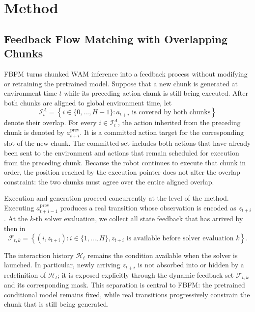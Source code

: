 
\section{Method}
\label{sec:method}


\subsection{Feedback Flow Matching with Overlapping Chunks}
\label{sec:method:overlap}

FBFM turns chunked WAM inference into a feedback process without modifying or
retraining the pretrained model. Suppose that a new chunk is generated at
environment time $t$ while its preceding action chunk is still being executed.
After both chunks are aligned to global environment time, let
\begin{equation}
    \mathcal I_t^A
    =
    \left\{
        i\in\{0,\ldots,H-1\}:
        a_{t+i}\text{ is covered by both chunks}
    \right\}
    \label{eq:action-overlap-set}
\end{equation}
denote their overlap. For every $i\in\mathcal I_t^A$, the action inherited from
the preceding chunk is denoted by $a_{t+i}^{\mathrm{prev}}$. It is a committed
action target for the corresponding slot of the new chunk. The committed set
includes both actions that have already been sent to the environment and actions
that remain scheduled for execution from the preceding chunk. Because the robot
continues to execute that chunk in order, the position reached by the execution
pointer does not alter the overlap constraint: the two chunks must agree over the
entire aligned overlap.

Execution and generation proceed concurrently at the level of the method. Executing
$a_{t+i-1}^{\mathrm{prev}}$ produces a real transition whose observation is encoded
as $z_{t+i}$. At the $k$-th solver evaluation, we collect all state feedback that
has arrived by then in
\begin{equation}
    \mathcal F_{t,k}
    =
    \left\{
        (i,z_{t+i}):i\in\{1,\ldots,H\},
        z_{t+i}\text{ is available before solver evaluation }k
    \right\}.
    \label{eq:dynamic-feedback-set}
\end{equation}

The interaction history $\mathcal H_t$ remains the condition available when the
solver is launched. In particular, newly arriving $z_{t+i}$ is not absorbed into
or hidden by a redefinition of $\mathcal H_t$; it is exposed explicitly through the
dynamic feedback set $\mathcal F_{t,k}$ and its corresponding mask. This separation
is central to FBFM: the pretrained conditional model remains fixed, while real
transitions progressively constrain the chunk that is still being generated.

